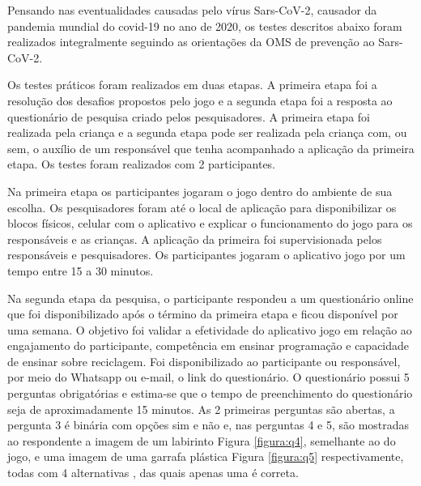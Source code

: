Pensando nas eventualidades causadas pelo vírus Sars-CoV-2, causador da pandemia mundial do covid-19 no ano de 2020, os testes descritos abaixo foram realizados integralmente seguindo as orientações da OMS \cite{oms_2020} de prevenção ao Sars-CoV-2.

Os testes práticos foram realizados em duas etapas. A primeira etapa foi a resolução dos desafios propostos pelo jogo e a segunda etapa foi a resposta ao questionário de pesquisa criado pelos pesquisadores. A primeira etapa foi realizada pela criança e a segunda etapa pode ser realizada pela criança com, ou sem, o auxílio de um responsável que tenha acompanhado a aplicação da primeira etapa. Os testes foram realizados com 2 participantes.

Na primeira etapa os participantes jogaram o jogo dentro do ambiente de sua escolha. Os pesquisadores foram até o local de aplicação para disponibilizar os blocos físicos, celular com o aplicativo e explicar o funcionamento do jogo para os responsáveis e as crianças. A aplicação da primeira foi supervisionada pelos responsáveis e pesquisadores. Os participantes jogaram o  aplicativo jogo por um tempo entre 15 a 30 minutos.

Na segunda etapa da pesquisa, o participante respondeu  a um questionário online que foi disponibilizado após o término da primeira etapa e ficou disponível por uma semana. O objetivo foi  validar a efetividade do aplicativo jogo em relação ao engajamento do participante, competência em ensinar programação e
capacidade de ensinar sobre reciclagem. Foi disponibilizado ao participante ou responsável, por meio do Whatsapp ou e-mail, o link do questionário. O questionário possui 5 perguntas obrigatórias e estima-se que o tempo de preenchimento do questionário seja de aproximadamente 15 minutos. As 2 primeiras perguntas são abertas, a pergunta 3 é binária com opções sim e não  e, nas perguntas 4 e 5, são mostradas ao respondente a imagem de um labirinto Figura \ref{figura:q4}, semelhante ao do jogo, e uma imagem de uma garrafa plástica Figura \ref{figura:q5} respectivamente, todas com 4 alternativas , das quais apenas uma é correta. 

